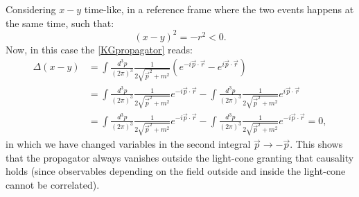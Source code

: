 Considering $x-y$ time-like, in a reference frame where the two events happens at the same time, such that:
\begin{equation*}
    (x-y)^2=-r^2<0.
\end{equation*}
Now, in this case the \eqref{KGpropagator} reads:
\begin{align*}
    \Delta(x-y)&=\int\frac{d^3p}{(2\pi)^3}\frac{1}{2\sqrt{\vec p^2+m^2}}(e^{-i\vec p\cdot\vec r}-e^{i\vec p\cdot\vec r})\\&=\int\frac{d^3p}{(2\pi)^3}\frac{1}{2\sqrt{\vec p^2+m^2}}e^{-i\vec p\cdot\vec r}-\int\frac{d^3p}{(2\pi)^3}\frac{1}{2\sqrt{\vec p^2+m^2}}e^{i\vec p\cdot\vec r}
    \\&=\int\frac{d^3p}{(2\pi)^3}\frac{1}{2\sqrt{\vec p^2+m^2}}e^{-i\vec p\cdot\vec r}-\int\frac{d^3p}{(2\pi)^3}\frac{1}{2\sqrt{\vec p^2+m^2}}e^{-i\vec p\cdot\vec r}=0,
\end{align*}
in which we have changed variables in the second integral $\vec p\rightarrow-\vec p$. This shows that the propagator always vanishes outside the light-cone granting that causality holds (since observables depending on the field outside and inside the light-cone cannot be correlated).\\

